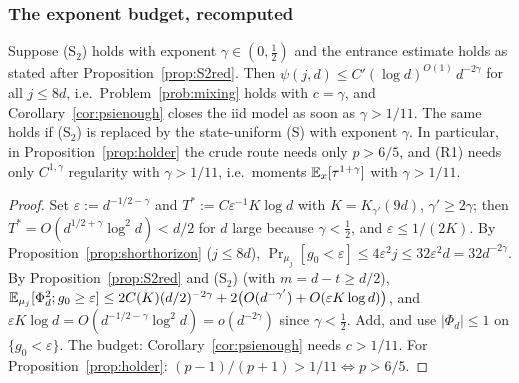 \subsubsection{The exponent budget, recomputed}\label{sec:s13budget}

\begin{corollary}
\label{cor:budget}
Suppose (S$_2$) holds with exponent $\gamma\in(0,\tfrac12)$ and the
entrance estimate holds as stated after Proposition~\ref{prop:S2red}.
Then $\psi(j,d)\le C'(\log d)^{O(1)}\,d^{-2\gamma}$ for all $j\le8d$,
i.e.\ Problem~\ref{prob:mixing} holds with $c=\gamma$, and
Corollary~\ref{cor:psienough} closes the iid model as soon as
$\gamma>1/11$.  The same holds if (S$_2$) is replaced by the
state-uniform (S) with exponent $\gamma$.  In particular, in
Proposition~\ref{prop:holder} the crude route needs only $p>6/5$,
and (R1) needs only $C^{1,\gamma}$ regularity with $\gamma>1/11$,
i.e.\ moments $\mathbb{E}_x[\tau^{1+\gamma}]$ with $\gamma>1/11$.
\end{corollary}

\begin{proof}
Set $\varepsilon:=d^{-1/2-\gamma}$ and $T^*:=C\varepsilon^{-1}K\log d$
with $K=K_{\gamma'}(9d)$, $\gamma'\ge2\gamma$; then
$T^*=O(d^{1/2+\gamma}\log^2d)<d/2$ for $d$ large because
$\gamma<\tfrac12$, and $\varepsilon\le1/(2K)$.  By
Proposition~\ref{prop:shorthorizon} ($j\le8d$),
$\Pr_{\mu_j}[g_0<\varepsilon]\le4\varepsilon^2j\le32\varepsilon^2d=32d^{-2\gamma}$.
By Proposition~\ref{prop:S2red} and (S$_2$) (with $m=d-t\ge d/2$),
$\mathbb{E}_{\mu_j}[\Phi_d^2;g_0\ge\varepsilon]\le2C(K)(d/2)^{-2\gamma}
+2\bigl(O(d^{-\gamma'})+O(\varepsilon K\log d)\bigr)$, and
$\varepsilon K\log d=O(d^{-1/2-\gamma}\log^2d)=o(d^{-2\gamma})$ since
$\gamma<\tfrac12$.  Add, and use $|\Phi_d|\le1$ on $\{g_0<\varepsilon\}$.
The budget: Corollary~\ref{cor:psienough} needs $c>1/11$.
For Proposition~\ref{prop:holder}: $(p-1)/(p+1)>1/11\iff p>6/5$.
\end{proof}

